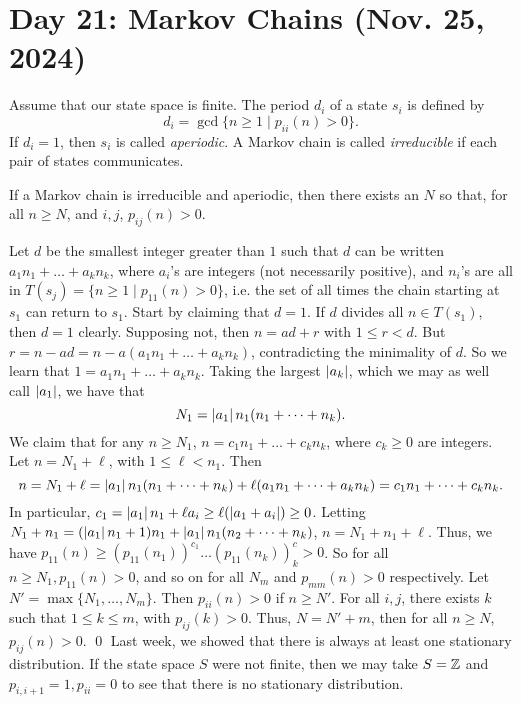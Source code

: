 \section{Day 21: Markov Chains (Nov. 25, 2024)}
Assume that our state space is finite. The period $d_i$ of a state $s_i$ is defined by
\[ d_i = \gcd \{ n \geq 1 \mid p_{ii}(n) > 0 \}. \]
If $d_i = 1$, then $s_i$ is called \textit{aperiodic}. A Markov chain is called \textit{irreducible} if each pair of states communicates.
\begin{simplelemma}
    If a Markov chain is irreducible and aperiodic, then there exists an $N$ so that, for all $n \geq N$, and $i, j$, $p_{ij}(n) > 0$.
\end{simplelemma}
\noindent Let $d$ be the smallest integer greater than $1$ such that $d$ can be written $a_1n_1 + \dots + a_kn_k$, where $a_i$'s are integers (not necessarily positive), and $n_i$'s are all in $T(s_j) = \{n \geq 1 \mid p_{11}(n) > 0\}$, i.e. the set of all times the chain starting at $s_1$ can return to $s_1$. Start by claiming that $d = 1$. If $d$ divides all $n \in T(s_1)$, then $d = 1$ clearly. Supposing not, then $n = ad + r$ with $1 \leq r < d$. But $r = n - ad = n - a(a_1n_1 + \dots + a_kn_k)$, contradicting the minimality of $d$. So we learn that $1 = a_1n_1 + \dots + a_kn_k$.
\medskip\newline
Taking the largest $\left\lvert a_k \right\rvert$, which we may as well call $\left\lvert a_1 \right\rvert$, we have that
\[ N_1 = \left\lvert a_1 \right\rvert n_1 (n_1 + \dots + n_k). \]
We claim that for any $n \geq N_1$, $n = c_1n_1 + \dots + c_kn_k$, where $c_k \geq 0$ are integers. Let $n = N_1 + \ell$, with $1 \leq \ell < n_1$. Then
\[ n = N_1 + \ell = \left\lvert a_1 \right\rvert n_1 (n_1 + \dots + n_k) + \ell (a_1n_1 + \dots + a_kn_k) = c_1 n_1 + \dots + c_k n_k. \]
In particular, $c_1 = \left\lvert a_1 \right\rvert n_1 + \ell a_i \geq \ell (\left\lvert a_1 + a_i \right\rvert) \geq 0$. Letting $N_1 + n_1 = (\left\lvert a_1 \right\rvert n_1 + 1)n_1 + \left\lvert a_1 \right\rvert n_1(n_2 + \dots + n_k)$, $n = N_1 + n_1 + \ell$. Thus, we have $p_{11}(n) \geq (p_{11}(n_1))^{c_1} \dots (p_{11}(n_k))^c_k > 0$. So for all $n \geq N_1, p_{11}(n) > 0$, and so on for all $N_m$ and $p_{mm}(n) > 0$ respectively. Let $N' = \max \{N_1, \dots, N_m\}$. Then $p_{ii}(n) > 0$ if $n \geq N'$. For all $i, j$, there exists $k$ such that $1 \leq k \leq m$, with $p_{ij}(k) > 0$. Thus, $N = N' + m$, then for all $n \geq N$, $p_{ij}(n) > 0$. \qed
\medskip\newline
Last week, we showed that there is always at least one stationary distribution. If the state space $S$ were not finite, then we may take $S = \mathbb Z$ and $p_{i, i+1} = 1, p_{ii} = 0$ to see that there is no stationary distribution.
